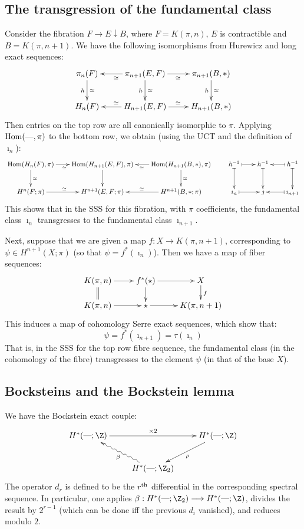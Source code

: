 \documentclass[11pt]{article}
\begin{document}
\setcounter{subsection}{1}
\subsection{The transgression of the fundamental class}
Consider  the fibration $F\rightarrow E\downarrow B$, where $F=K(\pi,n)$, $E$ is contractible and $B=K(\pi,n+1)$. We have the following isomorphisms from Hurewicz and long exact sequences:%
\[\xymatrix{
\pi_n(F)\ar[d]_h^\simeq&\pi_{n+1}(E,F)\ar[d]_h^\simeq\ar[l]^\simeq\ar[r]_\simeq&\pi_{n+1}(B,*)\ar[d]_h^\simeq\\
H_n(F)&H_{n+1}(E,F)\ar[l]_\simeq\ar[r]^\simeq&H_{n+1}(B,*)
}\]
Then entries on the top row are all canonically isomorphic to $\pi$. Applying $\operatorname{Hom}(\textup{---},\pi)$ to the bottom row, we obtain (using the UCT and the definition of $\imath_n$):
\[\xymatrix@C=.7cm{
\Hom(H_n(F),\pi)\ar[d]^\simeq\ar[r]_{\simeq\ \ }&
\Hom(H_{n+1}(E,F),\pi)\ar[d]&
\Hom(H_{n+1}(B,*),\pi)\ar[d]^\simeq\ar[l]^\simeq&
h^{-1}\ar@{|->}[r]\ar@{|->}[d]&
h^{-1}\ar@{|->}[d]&
h^{-1}\ar@{|->}[l]\ar@{|->}[d]\\
H^n(F;\pi)\ar[r]^{\simeq\ \ }&H^{n+1}(E,F;\pi)&H^{n+1}(B,*;\pi)\ar[l]_\simeq&
\imath_n\ar@{|->}[r]&\jmath&\imath_{n+1}\ar@{|->}[l]
}\]
This shows that in the SSS for this fibration, with $\pi$ coefficients, the fundamental class $\imath_n$ transgresses to the fundamental class $\imath_{n+1}$.

Next, suppose that we are given a map $f:X\to K(\pi,n+1)$, corresponding to $\psi\in H^{n+1}(X;\pi)$ (so that $\psi=f^*(\imath_n)$). Then we have a map of fiber sequences:
\[\xymatrix@R=5mm{
K(\pi,n)\ar[r]\ar@{=}[d]&f^*(\star)\ar[d]\ar[r]&X\ar[d]^f\\
K(\pi,n)\ar[r]&\star\ar[r]&K(\pi,n+1)
}\]
This induces a map of cohomology Serre exact sequences, which show that:
\begin{equation*}
\tag{Formula 1}\psi=f^*(\imath_{n+1})=\tau(\imath_n)
\end{equation*}
That is, in the SSS for the top row fibre sequence, the fundamental class (in the cohomology of the fibre) transgresses to the element $\psi$ (in that of the base $X$).

\subsection{Bocksteins and the Bockstein lemma}
We have the Bockstein exact couple:
\[\xymatrix{
H^*(\DASH;\Z)\ar[rr]^{\times2}&&H^*(\DASH;\Z)\ar[dl]^\rho\\
&H^*(\DASH;\Z_2)\ar@{~>}[ul]^{\beta}
}\]
The operator $d_r$ is defined to be the $r^\textup{th}$ differential in the corresponding spectral sequence. In particular, one applies $\beta:H^*(\DASH;\Z_2)\to H^*(\DASH;\Z)$, divides the result by $2^{r-1}$ (which can be done iff the previous $d_i$ vanished), and reduces modulo $2$.
\end{document}
